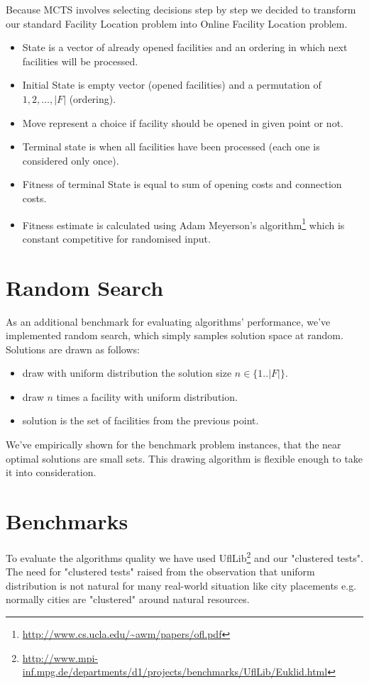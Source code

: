 Because MCTS involves selecting decisions step by step we decided to transform our
standard Facility Location problem into Online Facility Location problem.
\begin{itemize}
\item State is a vector of already opened facilities and an ordering in which
next facilities will be processed.
\item Initial State is empty vector (opened facilities) and a permutation
of $1,2,\dots, |F|$ (ordering).
\item Move represent a choice if facility should be opened in given point or not.
\item Terminal state is when all facilities have been processed (each one is
considered only once).
\item Fitness of terminal State is equal to sum of opening costs and connection costs.
\item Fitness estimate is calculated using Adam Meyerson's algorithm\footnote{\url{http://www.cs.ucla.edu/~awm/papers/ofl.pdf}}
which is constant competitive for randomised input.
\end{itemize}

\section{Random Search}

As an additional benchmark for evaluating algorithms' performance, we've implemented
random search, which simply samples solution space at random. Solutions are drawn as follows:
\begin{itemize}
\item draw with uniform distribution the solution size $n \in \{1..|F|\}$.
\item draw $n$ times a facility with uniform distribution.
\item solution is the set of facilities from the previous point.
\end{itemize}

We've empirically shown for the benchmark problem instances, that the near optimal
solutions are small sets. This drawing algorithm is flexible enough to take it
into consideration.

\section{Benchmarks}
To evaluate the algorithms quality we have used UflLib\footnote{\url{http://www.mpi-inf.mpg.de/departments/d1/projects/benchmarks/UflLib/Euklid.html}}
and our "clustered tests". The need for "clustered tests" raised from the observation that
uniform distribution is not natural for many real-world situation like city placements
e.g. normally cities are "clustered" around natural resources.

